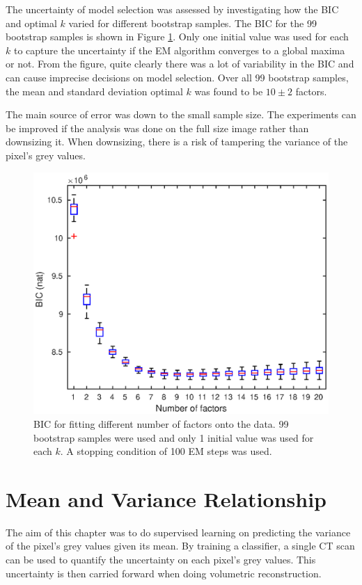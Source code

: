 \documentclass[12pt]{report}
\begin{document}
The uncertainty of model selection was assessed by investigating how the BIC and optimal $k$ varied for different bootstrap samples. The BIC for the 99 bootstrap samples is shown in Figure \ref{fig:initial_factor_BIC_bootstrap}. Only one initial value was used for each $k$ to capture the uncertainty if the EM algorithm converges to a global maxima or not. From the figure, quite clearly there was a lot of variability in the BIC and can cause imprecise decisions on model selection. Over all 99 bootstrap samples, the mean and standard deviation optimal $k$ was found to be $10\pm2$ factors.

The main source of error was down to the small sample size. The experiments can be improved if the analysis was done on the full size image rather than downsizing it. When downsizing, there is a risk of tampering the variance of the pixel's grey values.

\begin{figure}
	\centering
	\includegraphics[width=\textwidth]{figures/initial_factor_BIC_bootstrap.eps}
	\caption{BIC for fitting different number of factors onto the data. 99 bootstrap samples were used and only 1 initial value was used for each $k$. A stopping condition of 100 EM steps was used.}
	\label{fig:initial_factor_BIC_bootstrap}
\end{figure}

\chapter{Mean and Variance Relationship}
The aim of this chapter was to do supervised learning on predicting the variance of the pixel's grey values given its mean. By training a classifier, a single CT scan can be used to quantify the uncertainty on each pixel's grey values. This uncertainty is then carried forward when doing volumetric reconstruction.
\end{document}
